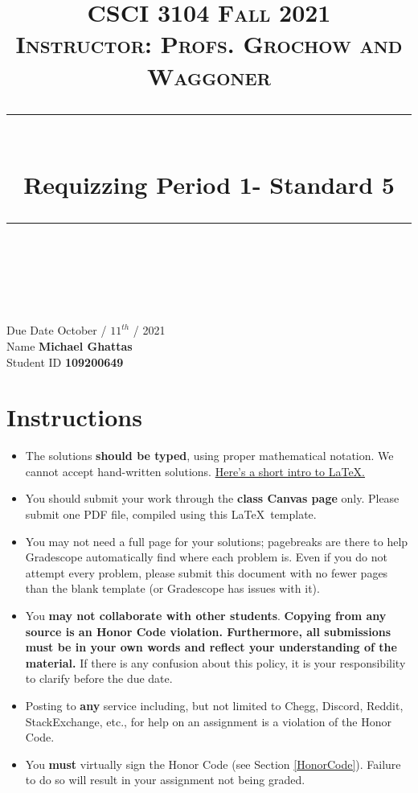 \documentclass[11pt]{article}
\title{
\normalfont \normalsize 
\textsc{CSCI 3104 Fall 2021 \\ 
Instructor: Profs. Grochow and Waggoner} \\
[10pt] 
\rule{\linewidth}{0.5pt} \\[6pt] 
\huge Requizzing Period 1- Standard 5 \\
\rule{\linewidth}{2pt}  \\[10pt]
}
\date{}
\theoremstyle{definition}
\theoremstyle{definition}
\theoremstyle{definition}
\begin{document}
\maketitle


\noindent
Due Date \dotfill October / $11^{th}$ / 2021 \\
Name \dotfill \textbf{Michael Ghattas} \\
Student ID \dotfill \textbf{109200649} \\


\tableofcontents

\section{Instructions}
 \begin{itemize}
	\item The solutions \textbf{should be typed}, using proper mathematical notation. We cannot accept hand-written solutions. \href{http://ece.uprm.edu/~caceros/latex/introduction.pdf}{Here's a short intro to \LaTeX.}
	\item You should submit your work through the \textbf{class Canvas page} only. Please submit one PDF file, compiled using this \LaTeX \ template.
	\item You may not need a full page for your solutions; pagebreaks are there to help Gradescope automatically find where each problem is. Even if you do not attempt every problem, please submit this document with no fewer pages than the blank template (or Gradescope has issues with it).

	\item You \textbf{may not collaborate with other students}. \textbf{Copying from any source is an Honor Code violation. Furthermore, all submissions must be in your own words and reflect your understanding of the material.} If there is any confusion about this policy, it is your responsibility to clarify before the due date. 

	\item Posting to \textbf{any} service including, but not limited to Chegg, Discord, Reddit, StackExchange, etc., for help on an assignment is a violation of the Honor Code.

	\item You \textbf{must} virtually sign the Honor Code (see Section \ref{HonorCode}). Failure to do so will result in your assignment not being graded.
\end{itemize}
\end{document}
